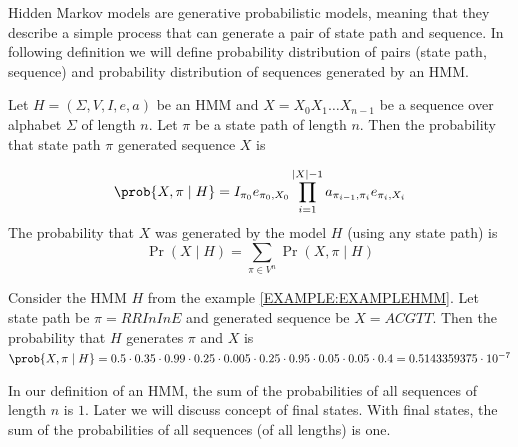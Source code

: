 
Hidden Markov models are generative probabilistic models, meaning that they
describe a simple process that can generate a pair of state path and sequence.
In following definition we will define probability distribution of pairs (state
path, sequence) and probability distribution of sequences generated by an HMM.

\begin{definition}
Let $H=(\Sigma,V,I,e,a)$ be an HMM and $X=X_0X_1\dots X_{n-1}$ be a sequence over
alphabet $\Sigma$ of length $n$. Let $\pi$ be a state path of length $n$. Then the
probability that state path $\pi$ generated sequence $X$ is 

\[\prob{X,\pi\mid H}=
I_{\pi_0}e_{\pi_0,X_0}\prod_{i=1}^{|X|-1}a_{\pi_{i-1},\pi_i}e_{\pi_i,X_i}\]
The probability that $X$ was generated by the
model $H$ (using any state path) is 
\[\Pr\left(X\mid H\right)=\sum_{\pi\in V^n}\Pr\left(X,\pi\mid H\right)\]

\end{definition}

\begin{example}
Consider the HMM $H$ from the example \ref{EXAMPLE:EXAMPLEHMM}. Let state path be $\pi=RRInInE$ and
generated sequence be $X=ACGTT$. Then the probability that $H$ generates $\pi$
and $X$ is 
$\prob{ X,\pi\mid H } = 0.5 \cdot 0.35 \cdot 0.99 \cdot 0.25 \cdot 0.005 \cdot 0.25 \cdot 0.95 \cdot 0.05 \cdot 0.05 \cdot 0.4 =
0.5143359375  \cdot  10^{-7}$
\end{example}



\begin{note}
In our  definition of an HMM, the sum of the probabilities of all sequences of
length $n$ is $1$. Later we will discuss concept of final states. With final
states, the sum of the probabilities of all sequences (of all lengths) is one.

\end{note}

